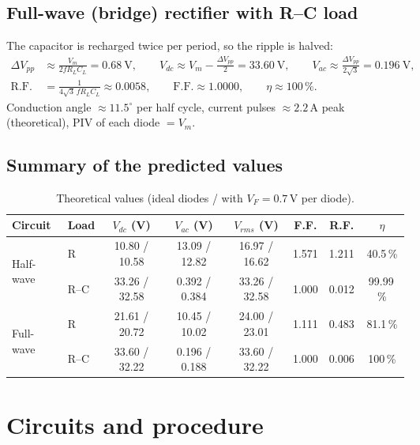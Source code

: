 \documentclass[11pt,a4paper]{article}
\begin{document}
\subsection{Full-wave (bridge) rectifier with R--C load}
The capacitor is recharged twice per period, so the ripple is halved:
\begin{align*}
\Delta V_{pp}&\approx\frac{V_m}{2fR_LC_L}=0.68\ \text{V},\qquad
V_{dc}\approx V_m-\frac{\Delta V_{pp}}{2}=33.60\ \text{V},\qquad
V_{ac}\approx\frac{\Delta V_{pp}}{2\sqrt3}=0.196\ \text{V},\\
\text{R.F.}&=\frac{1}{4\sqrt3\,fR_LC_L}\approx0.0058,\qquad \text{F.F.}\approx1.0000,\qquad
\eta\approx100\,\%.
\end{align*}
Conduction angle $\approx 11.5^\circ$ per half cycle, current pulses $\approx2.2$\,A peak
(theoretical), PIV of each diode $=V_m$.

\subsection{Summary of the predicted values}
\begin{table}[H]
\centering
\caption{Theoretical values (ideal diodes / with $V_F=0.7$\,V per diode).}
\begin{tabular}{llcccccc}
\toprule
Circuit & Load & $V_{dc}$ (V) & $V_{ac}$ (V) & $V_{rms}$ (V) & F.F. & R.F. & $\eta$\\
\midrule
\multirow{2}{*}{Half-wave} & R   & 10.80 / 10.58 & 13.09 / 12.82 & 16.97 / 16.62 & 1.571 & 1.211 & 40.5\,\%\\
                           & R--C& 33.26 / 32.58 & 0.392 / 0.384 & 33.26 / 32.58 & 1.000 & 0.012 & 99.99\,\%\\
\midrule
\multirow{2}{*}{Full-wave} & R   & 21.61 / 20.72 & 10.45 / 10.02 & 24.00 / 23.01 & 1.111 & 0.483 & 81.1\,\%\\
                           & R--C& 33.60 / 32.22 & 0.196 / 0.188 & 33.60 / 32.22 & 1.000 & 0.006 & 100\,\%\\
\bottomrule
\end{tabular}
\end{table}

\section{Circuits and procedure}
\end{document}
